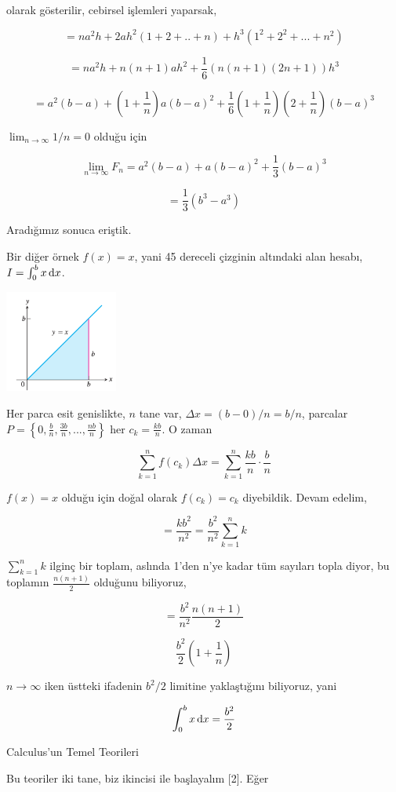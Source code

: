 \documentclass[12pt,fleqn]{article}\usepackage{../../common}
\begin{document}
olarak gösterilir, cebirsel işlemleri yaparsak,

$$
= na^2 h + 2ah^2 (1+2+..+n) + h^3 (1^2+2^2+...+n^2)
$$

$$
= na^2h + n(n+1)ah^2 + \frac{1}{6} (n(n+1)(2n+1))h^3
$$

$$
= a^2 (b-a) + (1+\frac{1}{n})a (b-a)^2 +
  \frac{1}{6} (1+\frac{1}{n})(2+\frac{1}{n})(b-a)^3
$$

$\lim_{n\to\infty} 1/n = 0$ olduğu için

$$
\lim_{n\to\infty} F_n = a^2(b-a) + a(b-a)^2 + \frac{1}{3} (b-a)^3 
$$

$$
= \frac{1}{3} (b^3 - a^3)
$$

Aradığımız sonuca eriştik.

Bir diğer örnek $f(x) = x$, yani 45 dereceli çizginin altındaki alan hesabı,
$I = \int_{0}^{b} x \,\mathrm{d} x$.

\includegraphics[width=10em]{ode_mattuck_94_int_01.png}

Her parca esit genislikte, $n$ tane var, $\Delta x = (b - 0) / n = b/n$,
parcalar $P = \left\{ 0, \frac{b}{n}, \frac{3b}{n}, ..., \frac{nb}{n}
\right\}$ her $c_k = \frac{kb}{n}$. O zaman 

$$ 
\sum_{k=1}^{n} f(c_k) \Delta x = \sum_{k=1}^{n} \frac{kb}{n} \cdot \frac{b}{n}
$$

$f(x) = x$ olduğu için doğal olarak $f(c_k)=c_k$ diyebildik. Devam edelim, 

$$ 
= \frac{kb^2}{n^2} = \frac{b^2}{n^2} \sum_{k=1}^{n} k
$$

$\sum_{k=1}^{n} k$ ilginç bir toplam, aslında 1'den n'ye kadar tüm
sayıları topla diyor, bu toplamın $\frac{n(n+1)}{2}$ olduğunu biliyoruz, 

$$ 
= \frac{b^2}{n^2} \frac{n(n+1)}{2}
$$

$$ 
\frac{b^2}{2} (1 + \frac{1}{n})
$$

$n \to \infty$ iken üstteki ifadenin $b^2/2$ limitine yaklaştığını
biliyoruz, yani

$$ 
\int_{0}^{b} x \,\mathrm{d} x = \frac{b^2}{2}
$$

Calculus'un Temel Teorileri

Bu teoriler iki tane, biz ikincisi ile başlayalım [2]. Eğer
\end{document}
